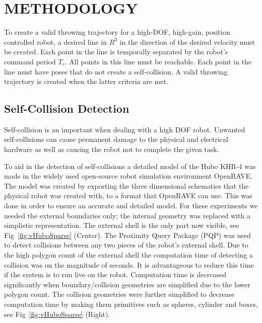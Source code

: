 \section{METHODOLOGY}\label{sec:methodology}
To create a valid throwing trajectory for a high-DOF, high-gain, position controlled robot, a desired line in $R^3$ in the direction of the desired velocity must be created.  Each point in the line is temporally separated by the robot's command period $T_r$.  All points in this line must be reachable.  Each point in the line must have poses that do not create a self-collision.  A valid throwing trajectory is created when the latter criteria are met.

\subsection{Self-Collision Detection}\label{sec:selfCollision}
Self-collision is an important when dealing with a high DOF robot.  Unwanted self-collisions can cause permanent damage to the physical and electrical hardware as well as causing the robot not to complete the given task.

To aid in the detection of self-collisions a detailed model of the Hubo KHR-4 was made in the widely used open-source robot simulation environment OpenRAVE\cite{diankovThesis}.  The model was created by exporting the three dimensional schematics that the physical robot was created with, to a format that OpenRAVE can use.  This was done in order to ensure an accurate and detailed model.  For these experiments we needed the external boundaries only; the internal geometry was replaced with a simplistic representation.  The external shell is the only part now visible, see Fig~\ref{fig:vHuboSparse} (Center).  The Proximity Query Package (PQP) was used to detect collisions between any two pieces of the robot's external shell.  Due to the high polygon count of the external shell the computation time of detecting a collision was on the magnitude of seconds.  It is advantageous to reduce this time if the system is to run live on the robot.  Computation time is decreased significantly when boundary/collision geometries are simplified due to the lower polygon count.  The collision geometries were further simplified to decrease computation time by making them primitives such as spheres, cylinder and boxes, see Fig~\ref{fig:vHuboSparse} (Right). 


